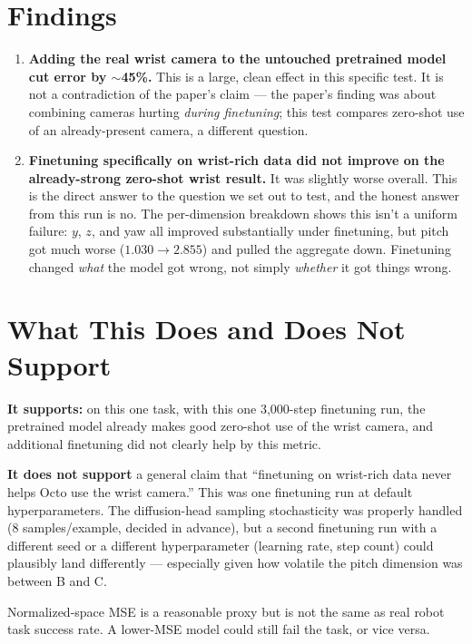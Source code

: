 \documentclass[11pt]{article}
\begin{document}
\section*{Findings}

\begin{enumerate}
    \item \textbf{Adding the real wrist camera to the untouched pretrained model cut error by $\sim$45\%.} This is a large, clean effect in this specific test. It is not a contradiction of the paper's claim --- the paper's finding was about combining cameras hurting \emph{during finetuning}; this test compares zero-shot use of an already-present camera, a different question.
    \item \textbf{Finetuning specifically on wrist-rich data did not improve on the already-strong zero-shot wrist result.} It was slightly worse overall. This is the direct answer to the question we set out to test, and the honest answer from this run is no. The per-dimension breakdown shows this isn't a uniform failure: $y$, $z$, and yaw all improved substantially under finetuning, but pitch got much worse ($1.030 \to 2.855$) and pulled the aggregate down. Finetuning changed \emph{what} the model got wrong, not simply \emph{whether} it got things wrong.
\end{enumerate}

\section*{What This Does and Does Not Support}

\textbf{It supports:} on this one task, with this one 3,000-step finetuning run, the pretrained model already makes good zero-shot use of the wrist camera, and additional finetuning did not clearly help by this metric.

\textbf{It does not support} a general claim that ``finetuning on wrist-rich data never helps Octo use the wrist camera.'' This was one finetuning run at default hyperparameters. The diffusion-head sampling stochasticity was properly handled (8 samples/example, decided in advance), but a second finetuning run with a different seed or a different hyperparameter (learning rate, step count) could plausibly land differently --- especially given how volatile the pitch dimension was between B and C.

Normalized-space MSE is a reasonable proxy but is not the same as real robot task success rate. A lower-MSE model could still fail the task, or vice versa.
\end{document}
